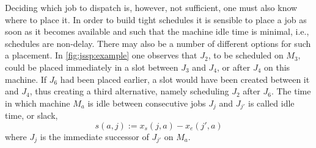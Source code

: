 \documentclass[smallextended]{svjour3}
\begin{document}
Deciding which job to dispatch is, however, not sufficient, one must also know 
where to place it. In order to build tight schedules it is sensible to place a 
job as soon as it becomes available and such that the machine idle time is 
minimal, i.e., schedules are non-delay. 
There may also be a number of different options for such a placement. 
In \cref{fig:jssp:example} one observes that $J_2$, to be scheduled on $M_3$, 
could be placed immediately in a slot between $J_3$ and $J_4$, or after $J_4$ 
on this machine. 
If $J_6$ had been placed earlier, a slot would have been created between it and 
$J_4$, thus creating a third alternative, namely scheduling $J_2$ after $J_6$. 
The time in which machine $M_a$ is idle between consecutive jobs $J_j$ and 
$J_{j'}$ is called idle time, or slack, 
\begin{equation} 
s(a,j):=x_s(j,a)-x_e(j',a) \label{eq:slack}
\end{equation}
where $J_j$ is the immediate successor of $J_{j'}$ on $M_a$. 
\end{document}
